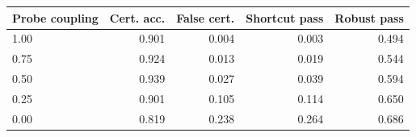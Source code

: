 \begin{tabular}{lrrrr}
\toprule
Probe coupling & Cert. acc. & False cert. & Shortcut pass & Robust pass \\
\midrule
1.00 & 0.901 & 0.004 & 0.003 & 0.494 \\
0.75 & 0.924 & 0.013 & 0.019 & 0.544 \\
0.50 & 0.939 & 0.027 & 0.039 & 0.594 \\
0.25 & 0.901 & 0.105 & 0.114 & 0.650 \\
0.00 & 0.819 & 0.238 & 0.264 & 0.686 \\
\bottomrule
\end{tabular}
